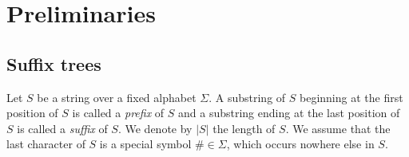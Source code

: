 \documentclass{llncs}
\newcommand{\partitle}[1]{}                        \newcommand{\commentout}[1]{}
\begin{document}
\section{Preliminaries}
\label{sec:preliminaries}




\subsection{Suffix trees}
\label{subsec:ST}



\partitle{Strings}

Let $S$ be a string over a fixed alphabet $\Sigma$.
A substring of $S$ beginning at the first position of $S$
 is called a {\it prefix} of $S$
 and a substring ending at the last position of $S$
 is called a {\it suffix} of $S$.
We denote by $|S|$ the length of $S$.
We assume that the last character of $S$ is a special symbol $\# \in \Sigma$,
 which occurs nowhere else in $S$.
\end{document}
